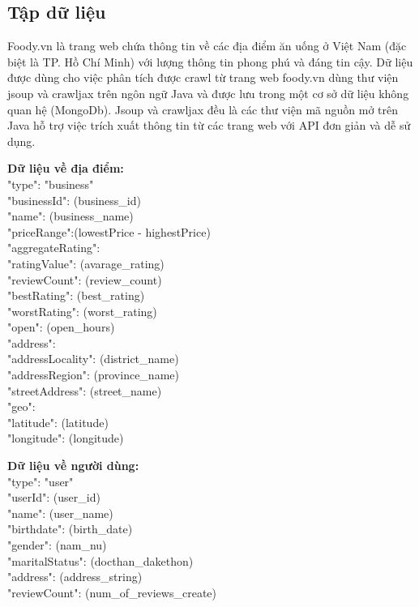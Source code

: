 \documentclass[12pt]{extarticle}
\begin{document}
		\subsection{Tập dữ liệu}
			\par Foody.vn là trang web chứa thông tin về các địa điểm ăn uống ở Việt Nam (đặc biệt là TP. Hồ Chí Minh) với lượng thông tin phong phú và đáng tin cậy. Dữ liệu được dùng cho việc phân tích được crawl từ trang web foody.vn dùng thư viện jsoup và crawljax trên ngôn ngữ Java và được lưu trong một cơ sở dữ liệu không quan hệ (MongoDb). Jsoup và crawljax đều là các thư viện mã nguồn mở trên Java hỗ trợ việc trích xuất thông tin từ các trang web với API đơn giản và dễ sử dụng.
			\par \textbf{Dữ liệu về địa điểm:}\\
				"type": "business"\\
				"businessId": (business\_id)\\
				"name": (business\_name)\\
				"priceRange":(lowestPrice - highestPrice)\\
				"aggregateRating":\\
				\hspace*{1.5cm}"ratingValue": (avarage\_rating)\\
				\hspace*{1.5cm}"reviewCount": (review\_count)\\
				\hspace*{1.5cm}"bestRating": (best\_rating)\\
				\hspace*{1.5cm}"worstRating": (worst\_rating)\\
				"open": (open\_hours)\\
				"address": \\
				\hspace*{1.5cm}"addressLocality": (district\_name)\\
				\hspace*{1.5cm}"addressRegion": (province\_name)\\
				\hspace*{1.5cm}"streetAddress": (street\_name)\\
				"geo":\\
				\hspace*{1.5cm}"latitude": (latitude)\\
				\hspace*{1.5cm}"longitude": (longitude)\\

			\par \textbf{Dữ liệu về người dùng:}\\
				"type": "user"\\
				"userId": (user\_id)\\
				"name": (user\_name)\\
				"birthdate": (birth\_date)\\
				"gender": (nam\_nu)\\
				"maritalStatus": (docthan\_dakethon)\\
				"address": (address\_string)\\
				"reviewCount": (num\_of\_reviews\_create)\\
\end{document}
